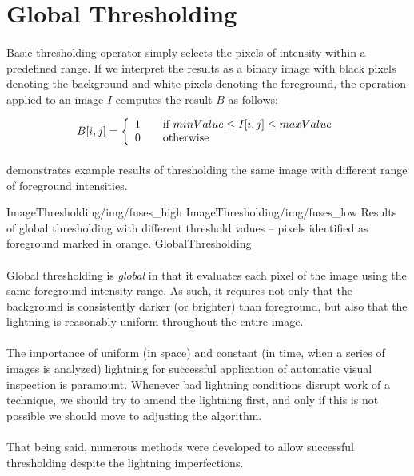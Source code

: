 \section{Global Thresholding}

\paragraph*{}
Basic thresholding operator simply selects the pixels of intensity within a predefined range. If we interpret the results as a binary image with black pixels denoting the background and white pixels denoting the foreground, the operation applied to an image $I$ computes the result $B$ as follows:

\[
B[i,j] = \left\{ 
  \begin{array}{l l}
    1 & \quad \text{if } minValue \leq I[i,j] \leq maxValue \\
    0 & \quad \text{otherwise} \\
  \end{array} \right.
\]

\paragraph*{}
 demonstrates example results of thresholding the same image with different range of foreground intensities.

\twoFigures
{ImageThresholding/img/fuses_high}
{ImageThresholding/img/fuses_low}
{Results of global thresholding with different threshold values -- pixels identified as foreground marked in orange.}
{GlobalThresholding}
{\basicWidth}

\paragraph*{}
Global thresholding is \textit{global} in that it evaluates each pixel of the image using the same foreground intensity range. As such, it requires not only that the background is consistently darker (or brighter) than foreground, but also that the lightning is reasonably uniform throughout the entire image.

\paragraph*{}
The importance of uniform (in space) and constant (in time, when a series of images is analyzed) lightning for successful application of automatic visual inspection is paramount. Whenever bad lightning conditions disrupt work of a technique, we should try to amend the lightning first, and only if this is not possible we should move to adjusting the algorithm. 

\paragraph*{}
That being said, numerous methods were developed to allow successful thresholding despite the lightning imperfections.

